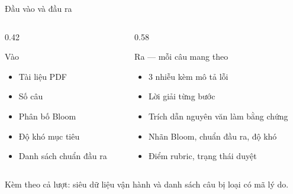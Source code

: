 \documentclass[aspectratio=169,11pt]{beamer}
\newcommand{\srcnote}[1]{\vfill{\scriptsize\color{cMuted}#1\par}}
\begin{document}
\begin{frame}{Đầu vào và đầu ra}
  \vfill
  \begin{columns}[T]
    \begin{column}{0.42\textwidth}
      \begin{block}{Vào}
        \begin{itemize}
          \item Tài liệu PDF
          \item Số câu
          \item Phân bố Bloom
          \item Độ khó mục tiêu
          \item Danh sách chuẩn đầu ra
        \end{itemize}
      \end{block}
    \end{column}
    \begin{column}{0.58\textwidth}
      \begin{block}{Ra --- mỗi câu mang theo}
        \begin{itemize}
          \item 3 nhiễu \alert{kèm mô tả lỗi}
          \item Lời giải từng bước
          \item \alert{Trích dẫn nguyên văn} làm bằng chứng
          \item Nhãn Bloom, chuẩn đầu ra, độ khó
          \item Điểm rubric, trạng thái duyệt
        \end{itemize}
      \end{block}
    \end{column}
  \end{columns}
  \vfill
  \srcnote{Kèm theo cả lượt: siêu dữ liệu vận hành và danh sách câu bị loại có mã lý do.}
\end{frame}

\end{document}
